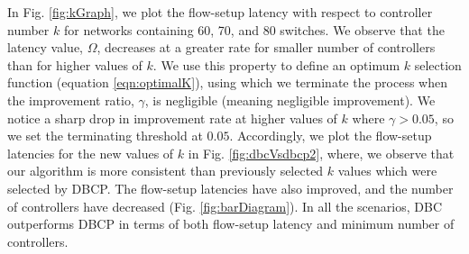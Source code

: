 \documentclass{IEEEtran}
\begin{document}
	In Fig. \ref{fig:kGraph}, we plot the flow-setup latency with respect to controller number $k$ for networks containing 60, 70, and 80 switches. We observe that the latency value, $\Omega$, decreases at a greater rate for smaller number of controllers than for higher values of $k$. We use this property to define an optimum $k$ selection function (equation \ref{eqn:optimalK}), using which we terminate the process when the improvement ratio, $\gamma$, is negligible (meaning negligible improvement). We notice a sharp drop in improvement rate at higher values of $k$ where $\gamma > 0.05$, so we set the terminating threshold at $0.05$. Accordingly, we plot the flow-setup latencies for the new values of $k$ in Fig. \ref{fig:dbcVsdbcp2}, where, we observe that our algorithm is more consistent than previously selected $k$ values which were selected by DBCP. The flow-setup latencies have also improved, and the number of controllers have decreased (Fig. \ref{fig:barDiagram}). In all the scenarios, DBC outperforms DBCP in terms of both flow-setup latency and minimum number of controllers.
	
\end{document}
